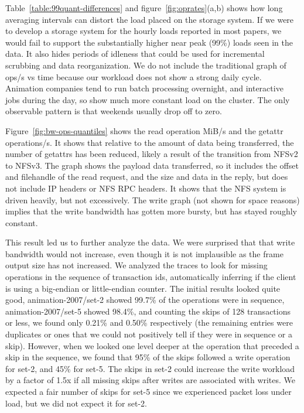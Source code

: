 Table~\ref{table:99quant-differences} and
figure~\ref{fig:oprates}(a,b) shows how long averaging intervals can
distort the load placed on the storage system.  If we were to develop
a storage system for the hourly loads reported in most papers, we
would fail to support the substantially higher near peak (99\%) loads
seen in the data.  It also hides periods of idleness that could be
used for incremental scrubbing and data reorganization.  We do not
include the traditional graph of ops/s vs time because our workload
does not show a strong daily cycle.  Animation companies tend to run
batch processing overnight, and interactive jobs during the day, so
show much more constant load on the cluster.  The only observable
pattern is that weekends usually drop off to zero.

Figure~\ref{fig:bw-ops-quantiles} shows the read operation MiB/s and
the getattr operations/s.  It shows that relative to the amount of
data being transferred, the number of getattrs has been reduced,
likely a result of the transition from NFSv2 to NFSv3.  The graph
shows the payload data transferred, so it includes the offset and
filehandle of the read request, and the size and data in the reply,
but does not include IP headers or NFS RPC headers.  It shows that the
NFS system is driven heavily, but not excessively. The write graph
(not shown for space reasons) implies that the write bandwidth has
gotten more bursty, but has stayed roughly constant.

This result led us to further analyze the data.  We were surprised
that that write bandwidth would not increase, even though it is not
implausible as the frame output size has not increased.  We analyzed
the traces to look for missing operations in the sequence of
transaction ids, automatically inferring if the client is using a
big-endian or little-endian counter.  The initial results looked quite
good, animation-2007/set-2 showed 99.7\% of the operations were in sequence,
animation-2007/set-5 showed 98.4\%, and counting the skips of 128 transactions
or less, we found only 0.21\% and 0.50\% respectively (the remaining
entries were duplicates or ones that we could not positively tell if
they were in sequence or a skip).  However, when we looked one level
deeper at the operation that preceded a skip in the sequence, we found
that 95\% of the skips followed a write operation for set-2, and 45\%
for set-5.  The skips in set-2 could increase the write workload by a
factor of 1.5x if all missing skips after writes are associated with
writes.  We expected a fair number of skips for set-5 since we
experienced packet loss under load, but we did not expect it for
set-2.

